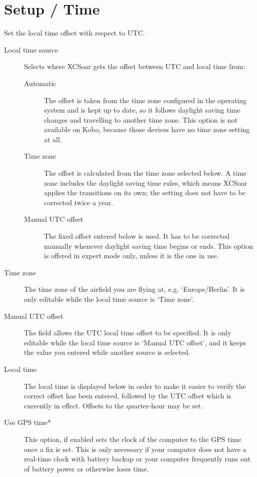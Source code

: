 \section{Setup / Time}

Set the local time offset with respect to UTC.

\begin{description}
\item[Local time source]  Selects where XCSoar gets the offset between UTC and local
  time from:
  \begin{description}
  \item[Automatic]  The offset is taken from the time zone configured in the operating
    system and is kept up to date, so it follows daylight saving time changes and
    travelling to another time zone.  This option is not available on Kobo, because
    those devices have no time zone setting at all.
  \item[Time zone]  The offset is calculated from the time zone selected below.  A time
    zone includes the daylight saving time rules, which means XCSoar applies the
    transitions on its own; the setting does not have to be corrected twice a year.
  \item[Manual UTC offset]  The fixed offset entered below is used.  It has to be
    corrected manually whenever daylight saving time begins or ends.  This option is
    offered in expert mode only, unless it is the one in use.
  \end{description}
\item[Time zone]  The time zone of the airfield you are flying at, e.g.
  `Europe/Berlin'.  It is only editable while the local time source is `Time zone'.
\item[Manual UTC offset]  The field allows the UTC local time offset to be specified.
  It is only editable while the local time source is `Manual UTC offset', and it keeps
  the value you entered while another source is selected.
\item[Local time]  The local time is displayed below in order to make it easier to verify
  the correct offset has been entered, followed by the UTC offset which is currently in
  effect.  Offsets to the quarter-hour may be set.
\item[Use GPS time*] This option, if enabled sets the clock of the computer to 
  the GPS time once a fix is set. This is only necessary if your computer does 
  not have a real-time clock with battery backup or your computer 
  frequently runs out of battery power or otherwise loses time.
\end{description}



